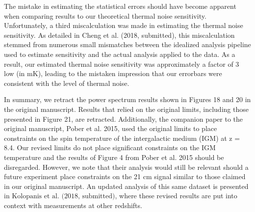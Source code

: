 \documentclass[onecolumn]{emulateapj} \shorttitle{}
\newcommand{\hMpci}{h\ {\rm Mpc}^{-1}}
\newcommand{\kolopaniscitet}{\textrm{Kolopanis et al. (2018, submitted)}}
\newcommand{\chengcitet}{\textrm{Cheng et al. (2018, submitted)}}
\begin{document}
The mistake in estimating the statistical errors should have become apparent when comparing results to our theoretical
thermal noise sensitivity.  Unfortunately, a third miscalculation was made in estimating the thermal noise sensitivity.
As detailed in \chengcitet, this miscalculation stemmed from numerous small mismatches between the idealized analysis
pipeline used to estimate sensitivity and the actual analysis applied to the data.  As a result, our estimated thermal
noise sensitivity was approximately a factor of 3 low (in $\textrm{mK}$), leading to the mistaken impression that our
errorbars were consistent with the level of thermal noise.

In summary, we retract the power spectrum results shown in Figures 18 and 20 in the original manuscript.
Results that relied on the original limits, including those presented in Figure 21,
are retracted.  Additionally, the companion paper to the original manuscript,
Pober et al. 2015, used the original limits to place constraints on the spin
temperature of the intergalactic medium (IGM) at z = 8.4.  Our revised limits
do not place significant constraints on the IGM temperature and the results of
Figure 4 from Pober et al. 2015 should be disregarded.  However, we note that
their analysis would still be relevant should a future experiment place
constraints on the 21 cm signal similar to those claimed in our original
manuscript.
An updated analysis of this same dataset is presented in $\kolopaniscitet$, where these revised results are put into context with measurements at other 
redshifts.


\nocite{*}


\end{document}
